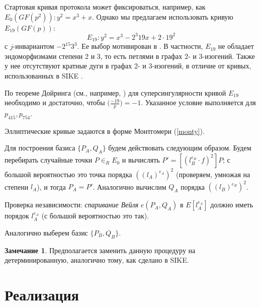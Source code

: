 \documentclass[a4paper,12pt]{article}
\theoremstyle{definition}
\newtheorem{remark}{Замечание}
\begin{document}
% 


Стартовая кривая протокола может фиксироваться, например, как $E_0(GF(p^2)): y^2=x^3+x$. %
Однако мы предлагаем использовать кривую   $E_{19}(GF(p))$:
\begin{equation}
E_{19}\!: y^2 = x^3 - 2^3 19 x + 2 \!\cdot\! 19^2
\end{equation}
с $j$-инвариантом $-2^{15} 3^3$. Ее выбор мотивирован в \cite{StartingCurve}. В частности,  $E_{19}$ не обладает эндоморфизмами степени 2 и 3, то есть петлями в
графах 2- и 3-изогений.  Также у  нее отсутствуют кратные дуги в графах 2- и 3-изогений, в отличие от   кривых, использованных в SIKE \cite{SIKE}.
 
По теореме Дойринга (см., например, \cite[Теорема 2.1]{Broker}) для суперсингулярности кривой $E_{19}$ необходимо и достаточно, чтобы $\big(\frac{-19}{p}\big) = -1$. %
Указанное условие выполняется для $p_{415}, p_{754}$.

Эллиптические кривые задаются   в форме Монтгомери (\ref{monty}).

Для построения базиса $\{P_A,Q_A\}$ будем действовать следующим образом.
Будем перебирать случайные точки   $P\in_R E_0$ и вычислять $P'=[(l_B ^{e_B}\cdot f)^2]P$; с большой вероятностью это точка порядка $((l_A)^{e_A})^2$ (проверяем, умножая на степени $l_A$), и тогда
 $P_A=P'$.
 Аналогично вычислим $Q_A$ порядка $((l_B)^{e_B})^2$. 
 
 Проверка независимости: \emph{спаривание Вейля} $e(P_A,Q_A)$ в $E[l_A^{e_A}]$ должно иметь порядок $l_A^{e_A}$ (с большой вероятностью это так).
 
Аналогично выберем базис $\{P_B,Q_B\}$.

\begin{remark}
 Предполагается заменить данную процедуру на детерминированную, аналогично тому, как сделано в SIKE.
\end{remark}





\section{Реализация}
\end{document}
